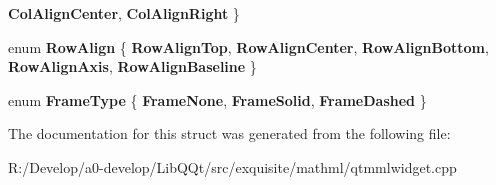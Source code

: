 \begin{DoxyCompactItemize}
{\bfseries Col\+Align\+Center}, 
{\bfseries Col\+Align\+Right}
 \}
\item 
\mbox{\label{struct_mml_a2b720e52020623a82f428a59e4a113aa}} 
enum {\bfseries Row\+Align} \{ \newline
{\bfseries Row\+Align\+Top}, 
{\bfseries Row\+Align\+Center}, 
{\bfseries Row\+Align\+Bottom}, 
{\bfseries Row\+Align\+Axis}, 
\newline
{\bfseries Row\+Align\+Baseline}
 \}
\item 
\mbox{\label{struct_mml_a185692bb913f3529956922ebae25e6ec}} 
enum {\bfseries Frame\+Type} \{ {\bfseries Frame\+None}, 
{\bfseries Frame\+Solid}, 
{\bfseries Frame\+Dashed}
 \}
\end{DoxyCompactItemize}


The documentation for this struct was generated from the following file\+:\begin{DoxyCompactItemize}
\item 
R\+:/\+Develop/a0-\/develop/\+Lib\+Q\+Qt/src/exquisite/mathml/qtmmlwidget.\+cpp\end{DoxyCompactItemize}
